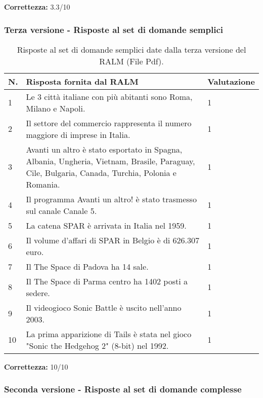 \textbf{Correttezza:} 3.3/10

\subsubsection{Terza versione - Risposte al set di domande semplici}

\begin{table}[H]
    \centering
    \begin{tabular}{|p{0.5cm} |p{6cm} |p{2cm}|}
        \hline
        \textbf{N}. & \textbf{Risposta fornita dal RALM} & \textbf{Valutazione} \\
        \hline
        1 & Le 3 città italiane con più abitanti sono Roma, Milano e Napoli. & 1 \\
        \hline
        2 & Il settore del commercio rappresenta il numero maggiore di imprese in Italia. & 1 \\
        \hline
        3 & Avanti un altro è stato esportato in Spagna, Albania, Ungheria, Vietnam, Brasile, Paraguay, Cile, Bulgaria, Canada, Turchia, Polonia e Romania. & 1 \\
        \hline
        4 & Il programma Avanti un altro! è stato trasmesso sul canale Canale 5. & 1 \\
        \hline
        5 & La catena SPAR è arrivata in Italia nel 1959. & 1 \\
        \hline
        6 & Il volume d'affari di SPAR in Belgio è di 626.307 euro. & 1 \\
        \hline
        7 & Il The Space di Padova ha 14 sale. & 1 \\
        \hline
        8 & Il The Space di Parma centro ha 1402 posti a sedere. & 1 \\
        \hline
        9 & Il videogioco Sonic Battle è uscito nell'anno 2003. & 1 \\
        \hline
        10 & La prima apparizione di Tails è stata nel gioco "Sonic the Hedgehog 2" (8-bit) nel 1992. & 1 \\
        \hline
    \end{tabular}
    \caption{Risposte al set di domande semplici date dalla terza versione del RALM (File Pdf).}
\end{table}

\textbf{Correttezza:} 10/10

\subsubsection{Seconda versione - Risposte al set di domande complesse}


